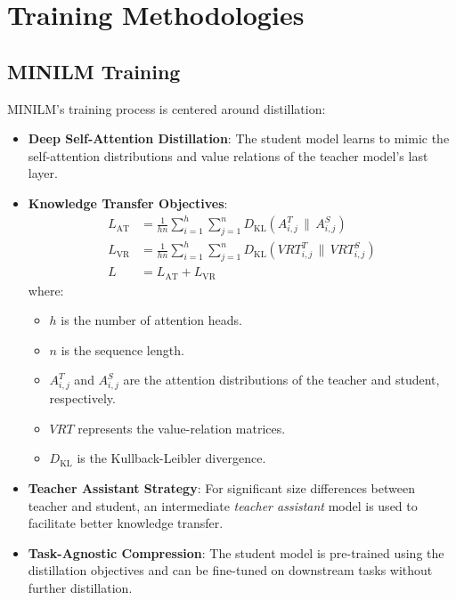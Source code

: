 \documentclass{article}
\begin{document}
\section{Training Methodologies}  
  
\subsection{MINILM Training}  
  
MINILM's training process is centered around distillation:  
  
\begin{itemize}  
    \item \textbf{Deep Self-Attention Distillation}: The student model learns to mimic the self-attention distributions and value relations of the teacher model's last layer.  
    \item \textbf{Knowledge Transfer Objectives}:  
    \begin{align}  
        L_{\text{AT}} &= \frac{1}{h n} \sum_{i=1}^{h} \sum_{j=1}^{n} D_{\text{KL}}\left( A^T_{i,j} \,\|\, A^S_{i,j} \right) \\  
        L_{\text{VR}} &= \frac{1}{h n} \sum_{i=1}^{h} \sum_{j=1}^{n} D_{\text{KL}}\left( VRT^T_{i,j} \,\|\, VRT^S_{i,j} \right) \\  
        L &= L_{\text{AT}} + L_{\text{VR}}  
    \end{align}  
    where:  
    \begin{itemize}  
        \item $h$ is the number of attention heads.  
        \item $n$ is the sequence length.  
        \item $A^T_{i,j}$ and $A^S_{i,j}$ are the attention distributions of the teacher and student, respectively.  
        \item $VRT$ represents the value-relation matrices.  
        \item $D_{\text{KL}}$ is the Kullback-Leibler divergence.  
    \end{itemize}  
    \item \textbf{Teacher Assistant Strategy}: For significant size differences between teacher and student, an intermediate \emph{teacher assistant} model is used to facilitate better knowledge transfer.  
    \item \textbf{Task-Agnostic Compression}: The student model is pre-trained using the distillation objectives and can be fine-tuned on downstream tasks without further distillation.  
\end{itemize}  
  
\end{document}
